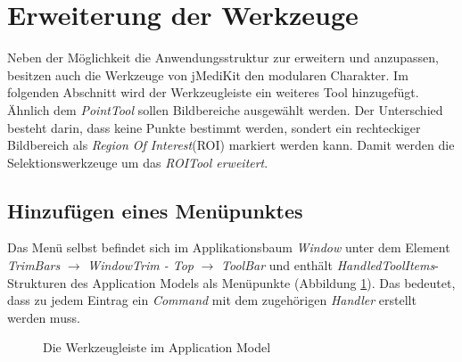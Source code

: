 \section{Erweiterung der Werkzeuge} \label{roitool}
Neben der Möglichkeit die Anwendungsstruktur zur erweitern und anzupassen, besitzen auch die Werkzeuge von jMediKit den modularen Charakter.
Im folgenden Abschnitt wird der Werkzeugleiste ein weiteres Tool hinzugefügt. Ähnlich dem \textit{PointTool} sollen Bildbereiche ausgewählt werden. Der Unterschied besteht darin, dass keine Punkte bestimmt werden, sondert ein rechteckiger Bildbereich als \textit{Region Of Interest}(ROI) markiert werden kann. Damit werden die Selektionswerkzeuge um das \textit{ROITool erweitert}.\\

\subsection{Hinzufügen eines Menüpunktes} 
Das Menü selbst befindet sich im Applikationsbaum \textit{Window} unter dem Element \textit{TrimBars} $\rightarrow$ \textit{WindowTrim - Top} $\rightarrow$ \textit{ToolBar} und enthält \textit{HandledToolItems}-Strukturen des Application Models als Menüpunkte (Abbildung \ref{toolmenu}). Das bedeutet, dass zu jedem Eintrag ein \textit{Command} mit dem zugehörigen \textit{Handler} erstellt werden muss.

\begin{figure}[H]
  \vspace{0.5cm}
  \centering
   \caption{Die Werkzeugleiste im Application Model}
  \label{toolmenu}
  \vspace{0.5cm}
\end{figure}

